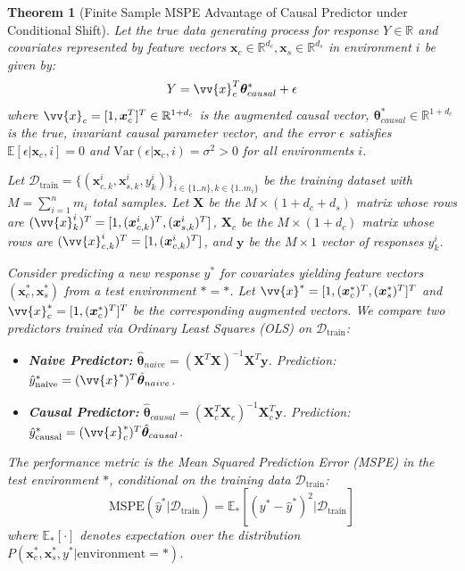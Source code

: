 \documentclass{article}
\newtheorem{theorem}{Theorem}
\newcommand{\response}{Y}                       %
\newcommand{\covarcausevec}{\bm{x}_c}            %
\newcommand{\covarsympvec}{\bm{x}_s}            %
\newcommand{\covarcausevecfull}[2]{\bm{x}_{c, #2}^{#1}} %
\newcommand{\covarsympvecfull}[2]{\bm{x}_{s, #2}^{#1}} %
\newcommand{\covarcausevecaug}{\vv{x}_c}           %
\newcommand{\covarvecfullaug}[2]{\vv{x}_{#2}^{#1}}     %
\newcommand{\covarcausevecfullaug}[2]{\vv{x}_{c, #2}^{#1}}%
\newcommand{\covarvecaugtest}{\vv{x}^*}             %
\newcommand{\covarcausevecaugtest}{\vv{x}_c^*}         %
\newcommand{\responsevar}[2]{y_{#2}^{#1}}       %
\newcommand{\samplesperenv}[1]{m_{#1}}          %
\newcommand{\envidx}{i}                         %
\newcommand{\sampleidx}{k}                      %
\newcommand{\numenv}{n}                         %
\newcommand{\totalsamples}{M}                   %
\newcommand{\param}{\theta}                     %
\newcommand{\paramvec}{\bm{\param}}             %
\newcommand{\paramtruecausal}{\paramvec_{causal}^*} %
\newcommand{\paramhatcausal}{\hat{\paramvec}_{causal}} %
\newcommand{\paramhatnaive}{\hat{\paramvec}_{naive}} %
\newcommand{\error}{\epsilon}                   %
\newcommand{\envtest}{*}                        %
\newcommand{\dataset}{\mathcal{D}}              %
\newcommand{\datasettrain}{\dataset_{\text{train}}} %
\newcommand{\datatrainmat}{\mathbf{X}}          %
\newcommand{\datatrainmatcause}{\mathbf{X}_c}   %
\newcommand{\datatrainresp}{\mathbf{y}}          %
\newcommand{\prednaive}{\hat{y}_{\text{naive}}^*} %
\newcommand{\predcausal}{\hat{y}_{\text{causal}}^*} %
\newcommand{\Expect}{\mathbb{E}}                %
\newcommand{\Var}{\mathrm{Var}}                 %
\newcommand{\MSPE}{\mathrm{MSPE}}               %
\begin{document}
\begin{theorem}[Finite Sample MSPE Advantage of Causal Predictor under Conditional Shift]
\label{thm:finite_sample}
Let the true data generating process for response $\response \in \mathbb{R}$ and covariates represented by feature vectors $\covarcausevec \in \mathbb{R}^{d_c}, \covarsympvec \in \mathbb{R}^{d_s}$ in environment $\envidx$ be given by:
\begin{equation}
\label{eq:true_model}
\response = \covarcausevecaug^T \paramtruecausal + \error
\end{equation}
where $\covarcausevecaug = [1, \covarcausevec^T]^T \in \mathbb{R}^{1+d_c}$ is the augmented causal vector, $\paramtruecausal \in \mathbb{R}^{1+d_c}$ is the true, invariant causal parameter vector, and the error $\error$ satisfies $\Expect[\error | \covarcausevec, \envidx] = 0$ and $\Var(\error | \covarcausevec, \envidx) = \sigma^2 > 0$ for all environments $\envidx$.

Let $\datasettrain = \{ (\covarcausevecfull{\envidx}{\sampleidx}, \covarsympvecfull{\envidx}{\sampleidx}, \responsevar{\envidx}{\sampleidx}) \}_{\envidx \in \{1..\numenv\}, \sampleidx \in \{1..\samplesperenv{\envidx}\}}$ be the training dataset with $\totalsamples = \sum_{\envidx=1}^{\numenv} \samplesperenv{\envidx}$ total samples.
Let $\datatrainmat$ be the $M \times (1+d_c+d_s)$ matrix whose rows are $(\covarvecfullaug{\envidx}{\sampleidx})^T = [1, (\covarcausevecfull{\envidx}{\sampleidx})^T, (\covarsympvecfull{\envidx}{\sampleidx})^T]$,
$\datatrainmatcause$ be the $M \times (1+d_c)$ matrix whose rows are $(\covarcausevecfullaug{\envidx}{\sampleidx})^T = [1, (\covarcausevecfull{\envidx}{\sampleidx})^T]$,
and $\datatrainresp$ be the $M \times 1$ vector of responses $\responsevar{\envidx}{\sampleidx}$.

Consider predicting a new response $y^*$ for covariates yielding feature vectors $(\covarcausevec^*, \covarsympvec^*)$ from a test environment $\envtest=*$. Let $\covarvecaugtest = [1, (\covarcausevec^*)^T, (\covarsympvec^*)^T]^T$ and $\covarcausevecaugtest = [1, (\covarcausevec^*)^T]^T$ be the corresponding augmented vectors. We compare two predictors trained via Ordinary Least Squares (OLS) on $\datasettrain$:
\begin{itemize}
    \item \textbf{Naive Predictor:} $\paramhatnaive = (\datatrainmat^T \datatrainmat)^{-1} \datatrainmat^T \datatrainresp$. Prediction: $\prednaive = (\covarvecaugtest)^T \paramhatnaive$.
    \item \textbf{Causal Predictor:} $\paramhatcausal = (\datatrainmatcause^T \datatrainmatcause)^{-1} \datatrainmatcause^T \datatrainresp$. Prediction: $\predcausal = (\covarcausevecaugtest)^T \paramhatcausal$.
\end{itemize}
The performance metric is the Mean Squared Prediction Error (MSPE) in the test environment $\envtest$, conditional on the training data $\datasettrain$:
\[ \MSPE(\hat{y}^* | \datasettrain) = \Expect_{\envtest}[ (y^* - \hat{y}^*)^2 | \datasettrain ] \]
where $\Expect_{\envtest}[\cdot]$ denotes expectation over the distribution $P(\covarcausevec^*, \covarsympvec^*, y^* | \text{environment}=\envtest)$.


\end{theorem}
\end{document}
